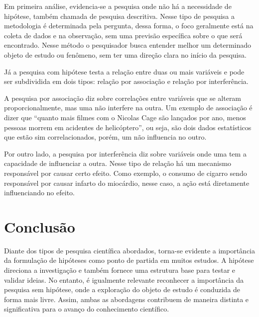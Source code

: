 Em primeira análise, evidencia-se a pesquisa onde não há a necessidade de hipótese, também chamada de pesquisa descritiva. Nesse tipo de pesquisa a metodologia é determinada pela pergunta, dessa forma, o foco geralmente está na coleta de dados e na observação, sem uma previsão específica sobre o que será encontrado. Nesse método o pesquisador busca entender melhor um determinado objeto de estudo ou fenômeno, sem ter uma direção clara no início da pesquisa.
	\par Já a pesquisa com hipótese testa a relação entre duas ou mais variáveis e pode ser subdividida em dois tipos: relação por associação e relação por interferência. 
\par A pesquisa por associação diz sobre correlações entre variáveis que se alteram proporcionalmente, mas uma não interfere na outra. Um exemplo de associação é dizer que “quanto mais filmes com o Nicolas Cage são lançados por ano, menos pessoas morrem em acidentes de helicóptero”, ou seja, são dois dados estatísticos que estão sim correlacionados, porém, um não influencia no outro.
\par Por outro lado, a pesquisa por interferência diz sobre variáveis onde uma tem a capacidade de influenciar a outra. Nesse tipo de relação há um mecanismo responsável por causar certo efeito. Como exemplo, o consumo de cigarro sendo responsável por causar infarto do miocárdio, nesse caso, a ação está diretamente influenciando no efeito. 



\section{\esp Conclusão}
Diante dos tipos de pesquisa científica abordados, torna-se evidente a importância da formulação de hipóteses como ponto de partida em muitos estudos. A hipótese direciona a investigação e também fornece uma estrutura base para testar e validar ideias. No entanto, é igualmente relevante reconhecer a importância da pesquisa sem hipótese, onde a exploração do objeto de estudo é conduzida de forma mais livre. Assim, ambas as abordagens contribuem de maneira distinta e significativa para o avanço do conhecimento científico.


% 
